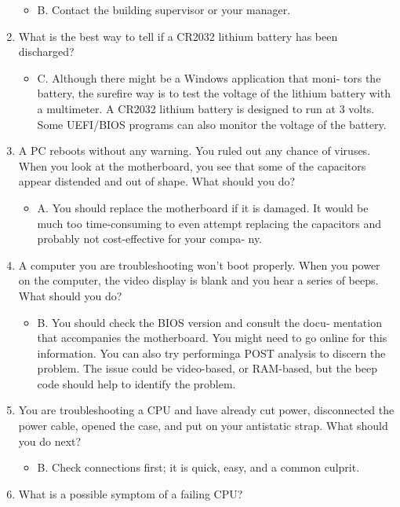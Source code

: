 \documentclass{article}
\begin{document}
\begin{enumerate}
\begin{itemize}
        \item B. Contact the building supervisor or your manager.
    \end{itemize}
    \item What is the best way to tell if a CR2032 lithium battery has
been discharged?
    \begin{itemize}
        \item C. Although there might be a Windows application that moni‐
tors the battery, the surefire way is to test the voltage of the
lithium battery with a multimeter. A CR2032 lithium battery is
designed to run at 3 volts. Some UEFI/BIOS programs can
also monitor the voltage of the battery.
    \end{itemize}
    \item A PC reboots without any warning. You ruled out any chance
of viruses. When you look at the motherboard, you see that
some of the capacitors appear distended and out of shape.
What should you do?
    \begin{itemize}
        \item A. You should replace the motherboard if it is damaged. It
would be much too time-consuming to even attempt replacing
the capacitors and probably not cost-effective for your compa‐
ny.
    \end{itemize}
    \item A computer you are troubleshooting won’t boot properly.
When you power on the computer, the video display is blank
and you hear a series of beeps. What should you do?
    \begin{itemize}
        \item B. You should check the BIOS version and consult the docu‐
mentation that accompanies the motherboard. You might need
to go online for this information. You can also try performinga POST analysis to discern the problem. The issue could be
video-based, or RAM-based, but the beep code should help to
identify the problem.
    \end{itemize}
    \item You are troubleshooting a CPU and have already cut power,
disconnected the power cable, opened the case, and put on your
antistatic strap. What should you do next?
    \begin{itemize}
        \item B. Check connections first; it is quick, easy, and a common
culprit.
    \end{itemize}
    \item What is a possible symptom of a failing CPU?

\end{enumerate}
\end{document}

